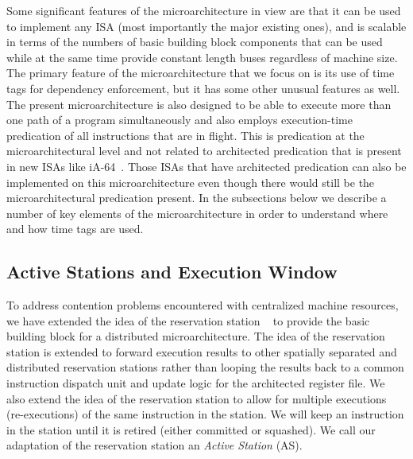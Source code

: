 \documentclass[10pt,dvips]{article}
\begin{document}
Some significant features of the microarchitecture in view 
are that it can 
be used to implement
any ISA (most importantly the major existing ones), and
is scalable in terms of the numbers of basic building block
components that can be used while at the same time provide
constant length buses regardless of machine size.
The primary feature of the microarchitecture that we focus on
is its use of time tags for dependency enforcement, but it
has some other unusual features as well.  
The present microarchitecture
is also designed to be able to execute more than one path
of a program simultaneously and also employs execution-time
predication of all instructions that are in flight.
This is predication at the microarchitectural level and not
related to architected predication that is present in
new ISAs like iA-64~\cite{ia64}.  
Those ISAs that have architected predication
can also be implemented on this microarchitecture even though there would
still be the microarchitectural predication present.
In the subsections below we describe a number of key elements
of the microarchitecture in order to understand where and how
time tags are used.
%
%
\subsection{Active Stations and Execution Window}
%
To address contention problems encountered with centralized
machine resources, we have extended the idea of the reservation
station ~\cite{Tom67} to provide the basic building block for a distributed
microarchitecture.  
The idea of the reservation station is extended to 
forward execution results to other spatially
separated and distributed reservation stations
rather than looping the results back to a common instruction dispatch
unit
and update logic for the architected register file.  
We also extend the idea
of the reservation station to allow for multiple executions (re-executions)
of the same instruction in the station.  We will keep an 
instruction in the station until it is retired (either committed or 
squashed).  
We call our adaptation of the reservation station an 
{\em Active Station} (AS).  
\end{document}
